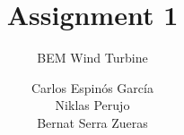 \documentclass[whitelogo]{tudelft-report}
\begin{document}
\frontmatter


\title[tudelft-white]{Assignment 1}
\subtitle[tudelft-black]{BEM Wind Turbine}
\author[tudelft-white]{ Carlos Espinós García \\
    Niklas Perujo \\  
    Bernat Serra Zueras }
\makecover[split]


%

% 

\tableofcontents

\mainmatter











\appendix

%


\end{document}
